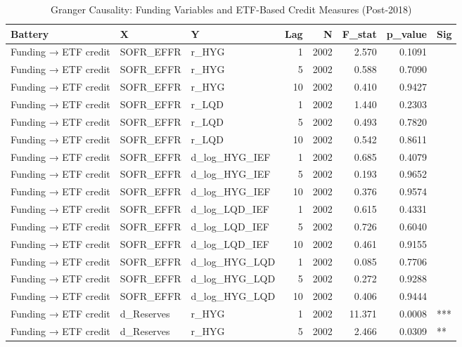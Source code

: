 \begin{table}[htbp]
\centering
\caption{Granger Causality: Funding Variables and ETF-Based Credit Measures (Post-2018)} 
\label{tab:granger_etf}
\begin{tabular}{lllrrrrl}
  \toprule
Battery & X & Y & Lag & N & F\_stat & p\_value & Sig \\ 
  \midrule
Funding → ETF credit & SOFR\_EFFR & r\_HYG & 1 & 2002 & 2.570 & 0.1091 &     \\ 
  Funding → ETF credit & SOFR\_EFFR & r\_HYG & 5 & 2002 & 0.588 & 0.7090 &     \\ 
  Funding → ETF credit & SOFR\_EFFR & r\_HYG & 10 & 2002 & 0.410 & 0.9427 &     \\ 
  Funding → ETF credit & SOFR\_EFFR & r\_LQD & 1 & 2002 & 1.440 & 0.2303 &     \\ 
  Funding → ETF credit & SOFR\_EFFR & r\_LQD & 5 & 2002 & 0.493 & 0.7820 &     \\ 
  Funding → ETF credit & SOFR\_EFFR & r\_LQD & 10 & 2002 & 0.542 & 0.8611 &     \\ 
  Funding → ETF credit & SOFR\_EFFR & d\_log\_HYG\_IEF & 1 & 2002 & 0.685 & 0.4079 &     \\ 
  Funding → ETF credit & SOFR\_EFFR & d\_log\_HYG\_IEF & 5 & 2002 & 0.193 & 0.9652 &     \\ 
  Funding → ETF credit & SOFR\_EFFR & d\_log\_HYG\_IEF & 10 & 2002 & 0.376 & 0.9574 &     \\ 
  Funding → ETF credit & SOFR\_EFFR & d\_log\_LQD\_IEF & 1 & 2002 & 0.615 & 0.4331 &     \\ 
  Funding → ETF credit & SOFR\_EFFR & d\_log\_LQD\_IEF & 5 & 2002 & 0.726 & 0.6040 &     \\ 
  Funding → ETF credit & SOFR\_EFFR & d\_log\_LQD\_IEF & 10 & 2002 & 0.461 & 0.9155 &     \\ 
  Funding → ETF credit & SOFR\_EFFR & d\_log\_HYG\_LQD & 1 & 2002 & 0.085 & 0.7706 &     \\ 
  Funding → ETF credit & SOFR\_EFFR & d\_log\_HYG\_LQD & 5 & 2002 & 0.272 & 0.9288 &     \\ 
  Funding → ETF credit & SOFR\_EFFR & d\_log\_HYG\_LQD & 10 & 2002 & 0.406 & 0.9444 &     \\ 
  Funding → ETF credit & d\_Reserves & r\_HYG & 1 & 2002 & 11.371 & 0.0008 & *** \\ 
  Funding → ETF credit & d\_Reserves & r\_HYG & 5 & 2002 & 2.466 & 0.0309 &  ** \\ 

\end{tabular}
\end{table}
